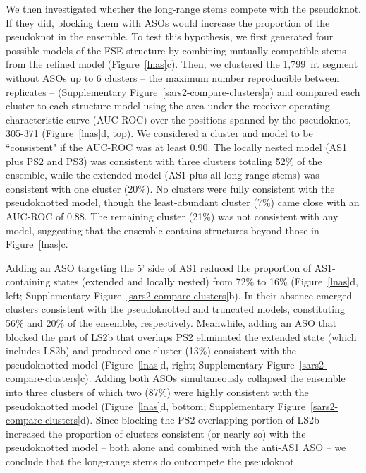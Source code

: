 \documentclass[main.tex]{subfiles}
\begin{document}
We then investigated whether the long-range stems compete with the pseudoknot.
If they did, blocking them with ASOs would increase the proportion of the pseudoknot in the ensemble.
To test this hypothesis, we first generated four possible models of the FSE structure by combining mutually compatible stems from the refined model (Figure~\ref{lnas}c).
Then, we clustered the 1,799~nt segment without ASOs up to 6 clusters -- the maximum number reproducible between replicates -- (Supplementary Figure~\ref{sars2-compare-clusters}a) and compared each cluster to each structure model using the area under the receiver operating characteristic curve (AUC-ROC) over the positions spanned by the pseudoknot, 305-371 (Figure~\ref{lnas}d, top).
We considered a cluster and model to be ``consistent" if the AUC-ROC was at least 0.90.
The locally nested model (AS1 plus PS2 and PS3) was consistent with three clusters totaling 52\% of the ensemble, while the extended model (AS1 plus all long-range stems) was consistent with one cluster (20\%).
No clusters were fully consistent with the pseudoknotted model, though the least-abundant cluster (7\%) came close with an AUC-ROC of 0.88.
The remaining cluster (21\%) was not consistent with any model, suggesting that the ensemble contains structures beyond those in Figure~\ref{lnas}c.

Adding an ASO targeting the 5' side of AS1 reduced the proportion of AS1-containing states (extended and locally nested) from 72\% to 16\% (Figure~\ref{lnas}d, left; Supplementary Figure~\ref{sars2-compare-clusters}b).
In their absence emerged clusters consistent with the pseudoknotted and truncated models, constituting 56\% and 20\% of the ensemble, respectively.
Meanwhile, adding an ASO that blocked the part of LS2b that overlaps PS2 eliminated the extended state (which includes LS2b) and produced one cluster (13\%) consistent with the pseudoknotted model (Figure~\ref{lnas}d, right; Supplementary Figure~\ref{sars2-compare-clusters}c).
Adding both ASOs simultaneously collapsed the ensemble into three clusters of which two (87\%) were highly consistent with the pseudoknotted model (Figure~\ref{lnas}d, bottom; Supplementary Figure~\ref{sars2-compare-clusters}d).
Since blocking the PS2-overlapping portion of LS2b increased the proportion of clusters consistent (or nearly so) with the pseudoknotted model -- both alone and combined with the anti-AS1 ASO -- we conclude that the long-range stems do outcompete the pseudoknot.
\end{document}
